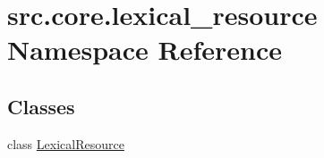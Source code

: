 \hypertarget{namespacesrc_1_1core_1_1lexical__resource}{\section{src.\+core.\+lexical\+\_\+resource Namespace Reference}
\label{namespacesrc_1_1core_1_1lexical__resource}
}
\subsection*{Classes}
\begin{DoxyCompactItemize}
\item 
class \hyperlink{classsrc_1_1core_1_1lexical__resource_1_1_lexical_resource}{Lexical\+Resource}
\end{DoxyCompactItemize}
